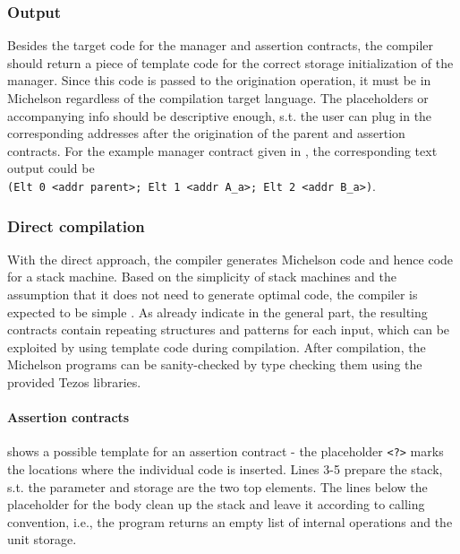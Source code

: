 \subsubsection{Output}
Besides the target code for the manager and assertion contracts, the compiler should return a piece of template code for the correct storage initialization of the manager. Since this code is passed to the origination operation, it must be in Michelson regardless of the compilation target language. The placeholders or accompanying info should be descriptive enough, s.t. the user can plug in the corresponding addresses after the origination of the parent and assertion contracts. For the example manager contract given in , the corresponding text output could be\\
\texttt{(Elt 0 <addr parent>; Elt 1 <addr A\_a>; Elt 2 <addr B\_a>)}.

\subsubsection{Direct compilation}\label{sec:direct}
With the direct approach, the compiler generates Michelson code and hence code for a stack machine. Based on the simplicity of stack machines and the assumption that it does not need to generate optimal code, the compiler is expected to be simple \cite{cs5641}\cite{ferr_compiler}\cite{wiki:stack_machine}. As already indicate in the general part, the resulting contracts contain repeating structures and patterns for each input, which can be exploited by using template code during compilation. After compilation, the Michelson programs can be sanity-checked by type checking them using the provided Tezos libraries.

\paragraph{Assertion contracts}
 shows a possible template for an assertion contract - the placeholder \texttt{<?>} marks the locations where the individual code is inserted. Lines 3-5 prepare the stack, s.t. the parameter and storage are the two top elements. The lines below the placeholder for the body clean up the stack and leave it according to calling convention, i.e., the program returns an empty list of internal operations and the unit storage.


